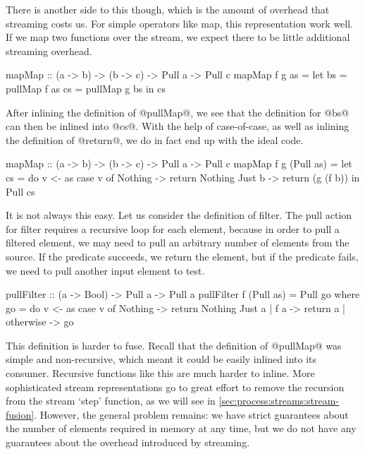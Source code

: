 There is another side to this though, which is the amount of overhead that streaming costs us.
For simple operators like map, this representation work well. If we map two functions over the stream, we expect there to be little additional streaming overhead.

\begin{code}
mapMap :: (a -> b) -> (b -> c) -> Pull a -> Pull c
mapMap f g as 
 = let bs = pullMap f as
       cs = pullMap g bs
   in  cs
\end{code}

After inlining the definition of @pullMap@, we see that the definition for @bs@ can then be inlined into @cs@.
With the help of case-of-case, as well as inlining the definition of @return@, we do in fact end up with the ideal code.

\begin{code}
mapMap :: (a -> b) -> (b -> c) -> Pull a -> Pull c
mapMap f g (Pull as)
 = let cs = do
          v <- as
          case v of
           Nothing -> return Nothing
           Just b  -> return (g (f b))
   in Pull cs
\end{code}

It is not always this easy.
Let us consider the definition of filter.
The pull action for filter requires a recursive loop for each element, because in order to pull a filtered element, we may need to pull an arbitrary number of elements from the source.
If the predicate succeeds, we return the element, but if the predicate fails, we need to pull another input element to test.

\begin{code}
pullFilter :: (a -> Bool) -> Pull a -> Pull a
pullFilter f (Pull as) = Pull go
 where
  go = do
    v <- as
    case v of
     Nothing -> return Nothing
     Just a  | f a
             -> return a
             | otherwise
             -> go
\end{code}

This definition is harder to fuse. Recall that the definition of @pullMap@ was simple and non-recursive, which meant it could be easily inlined into its consumer.
Recursive functions like this are much harder to inline.
More sophisticated stream representations go to great effort to remove the recursion from the stream `step' function, as we will see in \autoref{sec:process:streams:stream-fusion}.
However, the general problem remains: we have strict guarantees about the number of elements required in memory at any time, but we do not have any guarantees about the overhead introduced by streaming.


